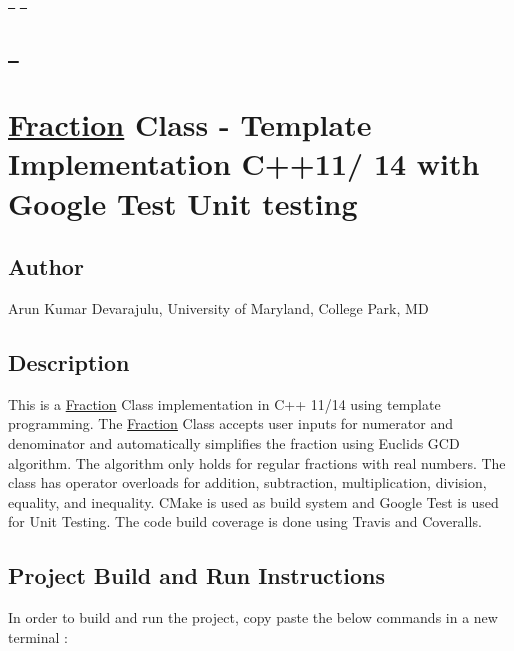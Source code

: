 \href{https://travis-ci.org/arunumd/FractionClass}{\texttt{ }} \href{https://coveralls.io/github/arunumd/FractionClass?branch=master}{\texttt{ }} \subsection*{\href{https://opensource.org/licenses/MIT}{\texttt{ }} }

\section*{\mbox{\hyperlink{class_fraction}{Fraction}} Class -\/ Template Implementation C++11/ 14 with Google Test Unit testing}

\subsection*{Author}

Arun Kumar Devarajulu, University of Maryland, College Park, MD

\subsection*{Description}

This is a \mbox{\hyperlink{class_fraction}{Fraction}} Class implementation in C++ 11/14 using template programming. The \mbox{\hyperlink{class_fraction}{Fraction}} Class accepts user inputs for numerator and denominator and automatically simplifies the fraction using Euclid\textquotesingle{}s G\+CD algorithm. The algorithm only holds for regular fractions with real numbers. The class has operator overloads for addition, subtraction, multiplication, division, equality, and inequality. C\+Make is used as build system and Google Test is used for Unit Testing. The code build coverage is done using Travis and Coveralls.

\subsection*{Project Build and Run Instructions}

In order to build and run the project, copy paste the below commands in a new terminal \+: 
\begin{DoxyCode}{0}
\end{DoxyCode}


